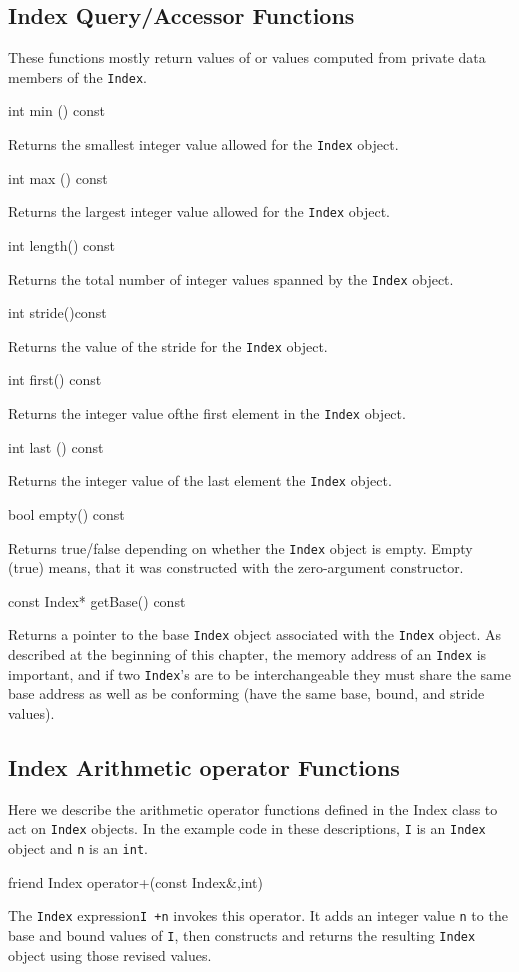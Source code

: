 \subsection{Index Query/Accessor Functions} 
These functions mostly return values of or values computed from private data members of the \texttt{Index}. 
\begin{smallcode}
int min () const 
\end{smallcode}
Returns the smallest integer value allowed for the \texttt{Index} object. 
\begin{smallcode}
int max () const 
\end{smallcode}
Returns the largest integer value allowed for the \texttt{Index} object. 
\begin{smallcode}
int length() const 
\end{smallcode}
Returns the total number of integer values spanned by the \texttt{Index} object. 
\begin{smallcode}
int stride()const
\end{smallcode} 
Returns the value of the stride for the \texttt{Index} object. 
\begin{smallcode}
int first() const 
\end{smallcode}
Returns the integer value ofthe first element in the \texttt{Index} object. 
\begin{smallcode}
int last () const 
\end{smallcode}
Returns the integer value of the last element the \texttt{Index} object. 
\begin{smallcode}
bool empty() const 
\end{smallcode}
Returns true/false depending on whether the \texttt{Index} object is empty. Empty (true) means, that it was constructed with the zero-argument constructor.
\begin{smallcode}
const Index* getBase() const 
\end{smallcode}
Returns a pointer to the base \texttt{Index} object associated with the \texttt{Index} object. As described at the beginning of this chapter, the memory address of an \texttt{Index} 
is important, and if two \texttt{Index}'s are to be interchangeable they must share the same base address as well as be conforming (have the same base, bound, and stride values). 


\subsection{Index Arithmetic operator Functions} 
Here we describe the arithmetic operator functions defined in the Index class to act on \texttt{Index} objects. In the example code in these descriptions, \texttt{I} is an \texttt{Index} object and \texttt{n} is an \texttt{int}.
\begin{smallcode}
friend Index operator+(const Index&,int)
\end{smallcode} 
The \texttt{Index} expression\texttt{I +n} invokes this operator. It adds an integer value \texttt{n} to the base and bound values of \texttt{I}, then constructs and returns the resulting \texttt{Index} object using those 
	revised values.
 
